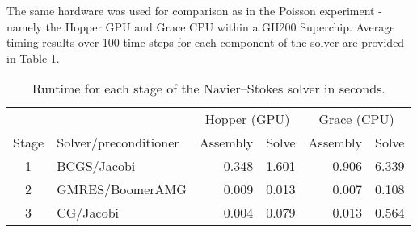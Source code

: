 The same hardware was used for comparison as in the Poisson experiment - namely the Hopper GPU and Grace CPU within a GH200 Superchip. Average timing results over 100 time steps for each component of the solver are provided in Table \ref{tab:navier_stokes_results}.
\begin{table}[t]
    \centering
\begin{tabular}{clrrrr}
\toprule
      &                 & \multicolumn{2}{c}{Hopper (GPU)} & \multicolumn{2}{c}{Grace (CPU)} \\
                          \cmidrule(lr){3-4}               \cmidrule(lr){5-6}
Stage & Solver/preconditioner       & Assembly & Solve               & Assembly & Solve \\
\midrule
    1 & BCGS/Jacobi     &    0.348 &               1.601 &    0.906 & 6.339 \\
    2 & GMRES/BoomerAMG &    0.009 &               0.013 &    0.007 & 0.108 \\
    3 & CG/Jacobi       &    0.004 &               0.079 &    0.013 & 0.564 \\
\bottomrule
\end{tabular}
\caption{Runtime for each stage of the Navier--Stokes solver in seconds.}
    \label{tab:navier_stokes_results}
\end{table}
